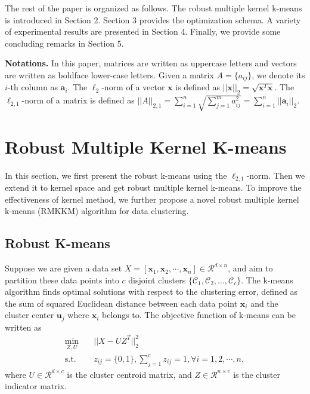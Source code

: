\documentclass{article}
\newcommand{\st}{\mathrm{s.t.}}
\begin{document}
The rest of the paper is organized as follows. The robust multiple kernel k-means is introduced in Section 2. Section 3 provides the optimization schema. A variety of experimental results are presented in Section 4. Finally, we provide some concluding remarks in Section 5.


\textbf{Notations.}  In this paper, matrices are written as uppercase letters and vectors are written as boldface lower-case letters. Given a matrix $A = \{a_{ij}\}$, we denote its $i$-th column as $\bm{a}_i$. The $\ell_2$-norm of a vector $\bm{x}$ is defined as $||\bm{x}||_2 = \sqrt{\bm{x}^T \bm{x}}$. The $\ell_{2,1}$-norm of a matrix is defined as $||A||_{2,1} = \sum_{i=1}^{n}\sqrt{\sum_{j=1}^{m} a_{ij}^2} = \sum_{i=1}^{n} ||\bm{a}_i||_2$.

\section{Robust Multiple Kernel K-means}
In this section, we first present the robust k-means using the $\ell_{2,1}$-norm. Then we extend it to kernel space and get robust multiple kernel k-means. To improve the effectiveness of kernel method, we further propose a novel robust multiple kernel k-means (RMKKM) algorithm for data clustering.
\subsection{Robust K-means}
Suppose we are given a data set $X = [\bm{x}_1, \bm{x}_2, \cdots, \bm{x}_n] \in \mathcal{R}^{d \times n} $, and aim to partition these data points into $c$ disjoint clusters $\{\mathcal{C}_1, \mathcal{C}_2, \ldots, \mathcal{C}_c\}$. The k-means algorithm finds optimal solutions with respect to the clustering error, defined as the sum of squared Euclidean distance between each data point $\bm{x}_i$ and the cluster center $\bm{u}_j$ where $\bm{x}_i$ belongs to. The objective function of k-means can be written as
\begin{align}\label{km_obj}
	\min_{Z,U} \quad & ||X - U Z^T||_2^2 \\
	\st \quad & z_{ij} = \{0, 1\}, \sum_{j=1}^{c} z_{ij} = 1, \forall i=1,2,\cdots,n, \nonumber
\end{align}
where $U \in \mathcal{R}^{d \times c}$ is the cluster centroid matrix, and $Z \in \mathcal{R}^{n \times c}$ is the cluster indicator matrix.
\end{document}

